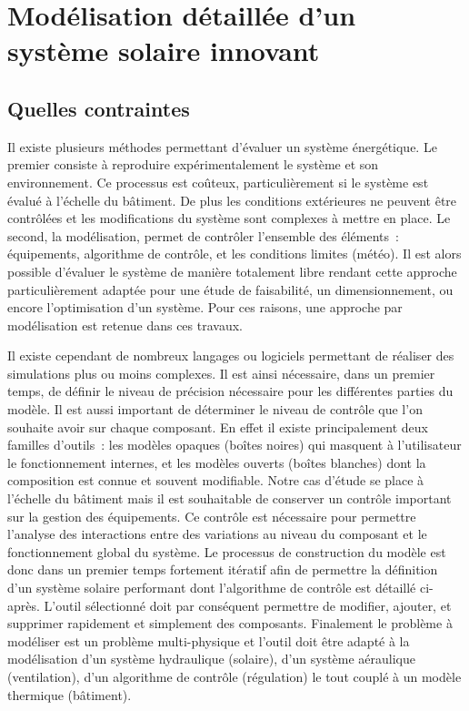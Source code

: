 
\section{Modélisation détaillée d’un système solaire innovant} %
\label{sec:modelisation_detaillee_d_un_systeme_solaire_innovant}
\subsection{Quelles contraintes} %
\label{sub:quelles_contraintes}
Il existe plusieurs méthodes permettant d’évaluer un système énergétique. Le premier
consiste à reproduire expérimentalement le système et son environnement. Ce processus est
coûteux, particulièrement si le système est évalué à l’échelle du bâtiment. De plus les
conditions extérieures ne peuvent être contrôlées et les modifications du système sont complexes à mettre en place.
Le second, la modélisation, permet de contrôler l’ensemble des éléments~: équipements,
algorithme de contrôle, et les conditions limites (météo).
Il est alors possible d’évaluer le système de
manière totalement libre rendant cette approche particulièrement adaptée pour une
étude de faisabilité, un dimensionnement, ou encore l’optimisation d’un système. Pour ces raisons,
une approche par modélisation est retenue dans ces travaux.

Il existe cependant de nombreux langages ou logiciels permettant de réaliser des
simulations plus ou moins complexes. Il est ainsi nécessaire, dans un premier temps, de
définir le niveau de précision nécessaire pour les différentes parties du modèle. Il est
aussi important de déterminer le niveau de contrôle que l’on souhaite avoir sur chaque
composant. En effet il existe principalement deux familles d’outils~: les modèles opaques
(boîtes noires) qui masquent à l’utilisateur le fonctionnement internes, et les modèles
ouverts (boîtes blanches) dont la composition est connue et souvent modifiable. Notre cas
d’étude se place à l’échelle du bâtiment mais il est souhaitable de conserver un contrôle
important sur la gestion des équipements. Ce contrôle est nécessaire pour permettre
l’analyse des interactions entre des variations au niveau du composant et le
fonctionnement global du système. Le processus de construction du modèle est donc dans un
premier temps fortement itératif afin de permettre la définition d’un système solaire
performant dont l’algorithme de contrôle est détaillé ci-après. L’outil sélectionné doit par conséquent
permettre de modifier, ajouter, et supprimer rapidement et simplement des composants. Finalement le
problème à modéliser est un problème multi-physique et l’outil doit être adapté à la
modélisation d’un système hydraulique (solaire), d’un système aéraulique (ventilation),
d’un algorithme de contrôle (régulation) le tout couplé à un modèle thermique (bâtiment).



